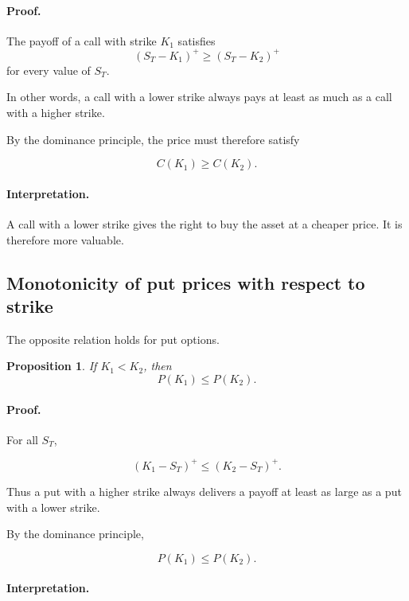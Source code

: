 \documentclass[11pt]{article}
\newcommand{\1}{\mathbf{1}}
\theoremstyle{plain}
\newtheorem{proposition}[theorem]{Proposition}
\theoremstyle{definition}
\theoremstyle{remark}
\begin{document}
\paragraph{Proof.}

The payoff of a call with strike \(K_1\) satisfies
\[
(S_T-K_1)^+ \ge (S_T-K_2)^+
\]
for every value of \(S_T\).

In other words, a call with a lower strike always pays at least as much
as a call with a higher strike.

By the dominance principle, the price must therefore satisfy

\[
C(K_1) \ge C(K_2).
\]

\paragraph{Interpretation.}

A call with a lower strike gives the right to buy the asset at a cheaper
price. It is therefore more valuable.

\subsection{Monotonicity of put prices with respect to strike}

The opposite relation holds for put options.

\begin{proposition}
If \(K_1 < K_2\), then
\[
P(K_1) \le P(K_2).
\]
\end{proposition}

\paragraph{Proof.}

For all \(S_T\),

\[
(K_1-S_T)^+ \le (K_2-S_T)^+ .
\]

Thus a put with a higher strike always delivers a payoff at least as
large as a put with a lower strike.

By the dominance principle,

\[
P(K_1) \le P(K_2).
\]

\paragraph{Interpretation.}
\end{document}

